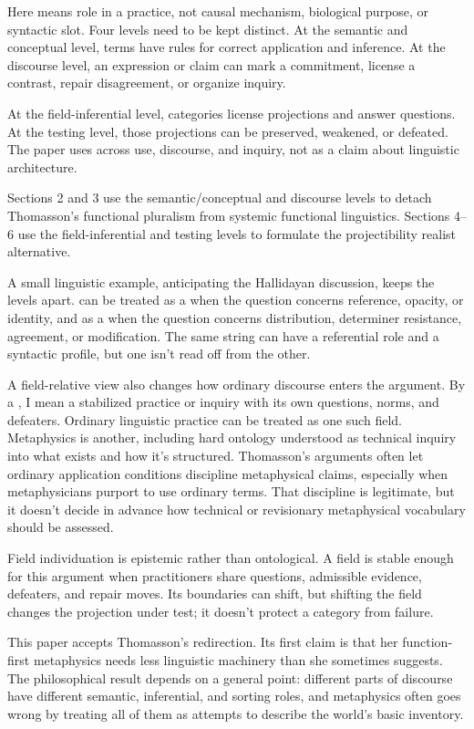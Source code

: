 \documentclass[12pt]{article}
\begin{document}
Here  means role in a practice, not causal mechanism, biological purpose, or syntactic slot. Four levels need to be kept distinct. At the semantic and conceptual level, terms have rules for correct application and inference. At the discourse level, an expression or claim can mark a commitment, license a contrast, repair disagreement, or organize inquiry.

At the field-inferential level, categories license projections and answer questions. At the testing level, those projections can be preserved, weakened, or defeated. The paper uses  across use, discourse, and inquiry, not as a claim about linguistic architecture.

Sections 2 and 3 use the semantic/conceptual and discourse levels to detach Thomasson's functional pluralism from systemic functional linguistics. Sections 4--6 use the field-inferential and testing levels to formulate the projectibility realist alternative.

A small linguistic example, anticipating the Hallidayan discussion, keeps the levels apart.  can be treated as a  when the question concerns reference, opacity, or identity, and as a  when the question concerns distribution, determiner resistance, agreement, or modification. The same string can have a referential role and a syntactic profile, but one isn't read off from the other.

A field-relative view also changes how ordinary discourse enters the argument. By a , I mean a stabilized practice or inquiry with its own questions, norms, and defeaters. Ordinary linguistic practice can be treated as one such field. Metaphysics is another, including hard ontology understood as technical inquiry into what exists and how it's structured. Thomasson's arguments often let ordinary application conditions discipline metaphysical claims, especially when metaphysicians purport to use ordinary terms. That discipline is legitimate, but it doesn't decide in advance how technical or revisionary metaphysical vocabulary should be assessed.

Field individuation is epistemic rather than ontological. A field is stable enough for this argument when practitioners share questions, admissible evidence, defeaters, and repair moves. Its boundaries can shift, but shifting the field changes the projection under test; it doesn't protect a category from failure.

This paper accepts Thomasson's redirection. Its first claim is that her function-first metaphysics needs less linguistic machinery than she sometimes suggests. The philosophical result depends on a general point: different parts of discourse have different semantic, inferential, and sorting roles, and metaphysics often goes wrong by treating all of them as attempts to describe the world's basic inventory.
\end{document}
